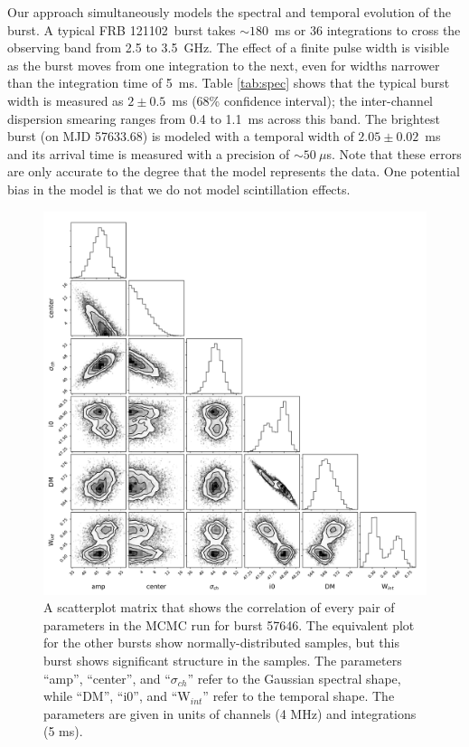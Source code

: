 \documentclass[twocolumn]{aastex61}
\newcommand{\frb}{FRB 121102}
\begin{document}
Our approach simultaneously models the spectral and temporal evolution of the burst. A typical \frb\ burst takes $\sim180$~ms or 36 integrations to cross the observing band from 2.5 to 3.5~GHz. The effect of a finite pulse width is visible as the burst moves from one integration to the next, even for widths narrower than the integration time of 5~ms. Table \ref{tab:spec} shows that the typical burst width is measured as $2\pm0.5$~ms (68\% confidence interval); the inter-channel dispersion smearing ranges from 0.4 to 1.1~ms across this band. The brightest burst (on MJD 57633.68) is modeled with a temporal width of $2.05\pm0.02$~ms and its arrival time is measured with a precision of $\sim50~\mu$s. Note that these errors are only accurate to the degree that the model represents the data. One potential bias in the model is that we do not model scintillation effects.

\begin{figure}[htb]
\begin{center}
\includegraphics[width=2\columnwidth]{corner57646.pdf}
\caption{A scatterplot matrix that shows the correlation of every pair of parameters in the MCMC run for burst 57646. The equivalent plot for the other bursts show normally-distributed samples, but this burst shows significant structure in the samples. The parameters ``amp'', ``center'', and ``$\sigma_{ch}$'' refer to the Gaussian spectral shape, while ``DM'', ``i0'', and ``W$_{int}$'' refer to the temporal shape. The parameters are given in units of channels (4 MHz) and integrations (5 ms).
\label{fig:corner}}
\end{center}
\end{figure}
\end{document}
